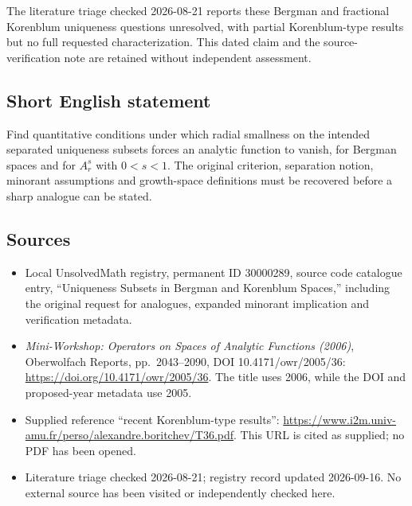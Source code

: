\documentclass[11pt]{article}
\begin{document}
The literature triage checked 2026-08-21 reports these Bergman and fractional Korenblum uniqueness questions unresolved, with partial Korenblum-type results but no full requested characterization. This dated claim and the source-verification note are retained without independent assessment.
\subsection{Short English statement}
Find quantitative conditions under which radial smallness on the intended separated uniqueness subsets forces an analytic function to vanish, for Bergman spaces and for \(A_r^s\) with \(0<s<1\). The original criterion, separation notion, minorant assumptions and growth-space definitions must be recovered before a sharp analogue can be stated.
\subsection{Sources}
\begin{itemize}
\item Local UnsolvedMath registry, permanent ID 30000289, source code catalogue entry, ``Uniqueness Subsets in Bergman and Korenblum Spaces,'' including the original request for analogues, expanded minorant implication and verification metadata.
\item \emph{Mini-Workshop: Operators on Spaces of Analytic Functions (2006)}, Oberwolfach Reports, pp.\ 2043--2090, DOI 10.4171/owr/2005/36: \url{https://doi.org/10.4171/owr/2005/36}. The title uses 2006, while the DOI and proposed-year metadata use 2005.
\item Supplied reference ``recent Korenblum-type results'': \url{https://www.i2m.univ-amu.fr/perso/alexandre.boritchev/T36.pdf}. This URL is cited as supplied; no PDF has been opened.
\item Literature triage checked 2026-08-21; registry record updated 2026-09-16. No external source has been visited or independently checked here.
\end{itemize}
\end{document}
